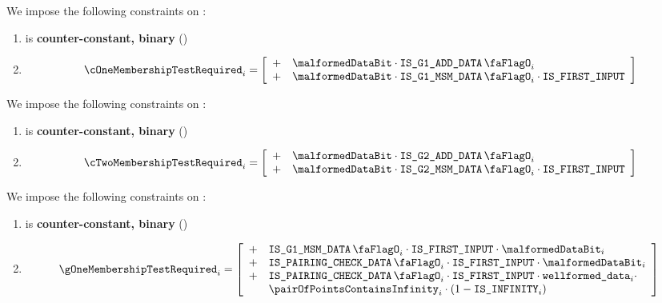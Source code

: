 We impose the following constraints on \cOneMembershipTestRequired{}:
\begin{enumerate}
    \item \cOneMembershipTestRequired{} is \textbf{counter-constant, binary} \quad (\trash)
    \item %
        \[  
            \cOneMembershipTestRequired_{i} = 
            \left[ \begin{array}{clcr}
              + & \malformedDataBit \cdot \isBlsGOneAddData_{i} \\
              + & \malformedDataBit \cdot \isBlsGOneMsmData_{i} \cdot \isFirstInput \\
            \end{array} \right] \vspace{2mm}  
        \]
\end{enumerate}
\noindent
We impose the following constraints on \cTwoMembershipTestRequired{}:
\begin{enumerate}
    \item \cTwoMembershipTestRequired{} is \textbf{counter-constant, binary} \quad (\trash)
    \item 
    \[  
        \cTwoMembershipTestRequired_{i} = 
        \left[ \begin{array}{clcr}
          + & \malformedDataBit \cdot \isBlsGTwoAddData_{i} \\
          + & \malformedDataBit \cdot \isBlsGTwoMsmData_{i} \cdot \isFirstInput \\
        \end{array} \right] \vspace{2mm}  
    \]
\end{enumerate}
\noindent
We impose the following constraints on \gOneMembershipTestRequired{}:
\begin{enumerate}
    \item \gOneMembershipTestRequired{} is \textbf{counter-constant, binary} \quad (\trash)
    \item 
        \[
            \gOneMembershipTestRequired_{i} = 
                \left[ \begin{array}{cl} 
                    + & \isBlsGOneMsmData_{i} \cdot \isFirstInput \cdot \malformedDataBit_{i}  \\
                    + & \isBlsPairingCheckData_{i} \cdot \isFirstInput \cdot \malformedDataBit_{i} \\
                    + & \isBlsPairingCheckData_{i} \cdot \isFirstInput \cdot \locWellformedData_{i} \cdot \\
                      & \pairOfPointsContainsInfinity_{i} \cdot (1 - \isInfinity_{i}) \\
                \end{array} \right] \\
        \]
\end{enumerate}
